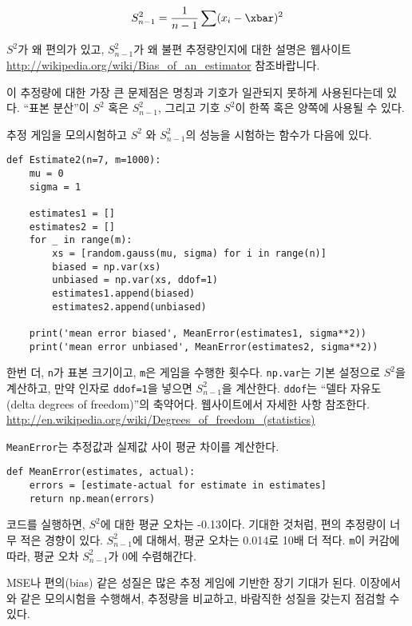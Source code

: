 %
\[ S_{n-1}^2 = \frac{1}{n-1} \sum (x_i - \xbar)^2 \] 
%

$S^2$가 왜 편의가 있고, $S_{n-1}^2$가 왜 불편 추정량인지에 대한 설명은 웹사이트 \url{http://wikipedia.org/wiki/Bias_of_an_estimator} 참조바랍니다.

이 추정량에 대한 가장 큰 문제점은 명칭과 기호가 일관되지 못하게 사용된다는데 있다. ``표본 분산''이 $S^2$ 혹은 $S_{n-1}^2$, 
그리고 기호 $S^2$이 한쪽 혹은 양쪽에 사용될 수 있다.

추정 게임을 모의시험하고 $S^2$ 와 $S_{n-1}^2$의 성능을 시험하는 함수가 다음에 있다.

\begin{verbatim}
def Estimate2(n=7, m=1000):
    mu = 0
    sigma = 1

    estimates1 = []
    estimates2 = []
    for _ in range(m):
        xs = [random.gauss(mu, sigma) for i in range(n)]
        biased = np.var(xs)
        unbiased = np.var(xs, ddof=1)
        estimates1.append(biased)
        estimates2.append(unbiased)

    print('mean error biased', MeanError(estimates1, sigma**2))
    print('mean error unbiased', MeanError(estimates2, sigma**2))
\end{verbatim}

한번 더, {\tt n}가 표본 크기이고, {\tt m}은 게임을 수행한 횟수다.
{\tt np.var}는 기본 설정으로 $S^2$을 계산하고, 만약 인자로 {\tt ddof=1}을 넣으면 $S_{n-1}^2$을 계산한다. {\tt ddof}는 ``델타 자유도 (delta degrees of freedom)''의 축약어다. 웹사이트에서 자세한 사항 참조한다. \url{http://en.wikipedia.org/wiki/Degrees_of_freedom_(statistics)}

{\tt MeanError}는 추정값과 실제값 사이 평균 차이를 계산한다.

\begin{verbatim}
def MeanError(estimates, actual):
    errors = [estimate-actual for estimate in estimates]
    return np.mean(errors)
\end{verbatim}

코드를 실행하면, $S^2$에 대한 평균 오차는 -0.13이다.
기대한 것처럼, 편의 추정량이 너무 적은 경향이 있다. 
$S_{n-1}^2$에 대해서, 평균 오차는 0.014로 10배 더 적다.
{\tt m}이 커감에 따라, 평균 오차 $S_{n-1}^2$가 0에 수렴해간다.


MSE나 편의(bias) 같은 성질은 많은 추정 게임에 기반한 장기 기대가 된다.
이장에서와 같은 모의시험을 수행해서, 추정량을 비교하고, 바람직한 성질을 갖는지 점검할 수 있다.

